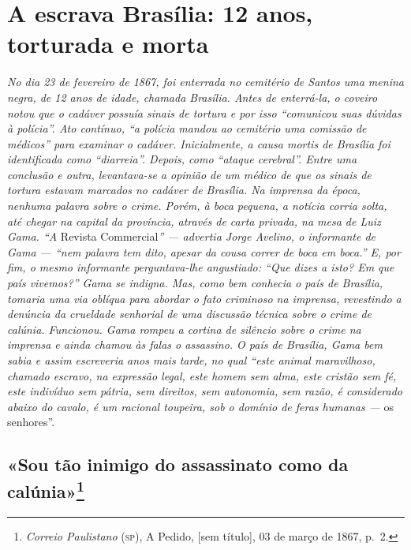 \part{A escrava Brasília: 12 anos, torturada e morta}

\begin{argumento}
\emph{No dia 23 de fevereiro de 1867, foi enterrada no cemitério de
Santos uma menina negra, de 12 anos de idade, chamada Brasília. Antes de
enterrá-la, o coveiro notou que o cadáver possuía sinais de tortura e
por isso ``comunicou suas dúvidas à polícia''. Ato contínuo, ``a polícia
mandou ao cemitério uma comissão de médicos'' para examinar o cadáver.
Inicialmente, a \emph{causa mortis} de Brasília foi identificada como
``diarreia''. Depois, como ``ataque cerebral''. Entre uma conclusão e outra,
levantava-se a opinião de um médico de que os sinais de tortura estavam
marcados no cadáver de Brasília. Na imprensa da época, nenhuma palavra
sobre o crime. Porém, à boca pequena, a notícia corria solta, até chegar
na capital da província, através de carta privada, na mesa de Luiz Gama.
``A} Revista Commercial\emph{'' --- advertia Jorge Avelino, o informante de
Gama --- ``nem palavra tem dito, apesar da cousa correr de boca em boca.''
E, por fim, o mesmo informante perguntava-lhe angustiado: ``Que dizes a
isto? Em que país vivemos?'' Gama se indigna. Mas, como bem
conhecia o país de Brasília, tomaria uma via oblíqua para abordar o fato
criminoso na imprensa, revestindo a denúncia da crueldade senhorial de
uma discussão técnica sobre o crime de calúnia. Funcionou. Gama rompeu a
cortina de silêncio sobre o crime na imprensa e ainda chamou às falas o
assassino. O país de Brasília, Gama bem sabia e assim escreveria anos
mais tarde, no qual ``este animal maravilhoso, chamado escravo, na expressão
legal, este homem sem alma, este cristão sem fé, este indivíduo sem
pátria, sem direitos, sem autonomia, sem razão, é considerado abaixo do
cavalo, é um racional toupeira, sob o domínio de feras humanas ---} os
senhores''.
\end{argumento}

\chapter{«Sou tão inimigo do assassinato como da
calúnia»\footnote{\emph{Correio Paulistano} (\textsc{sp}), A Pedido,
  {[}sem título{]}, 03 de março de 1867, p.~2.}}

